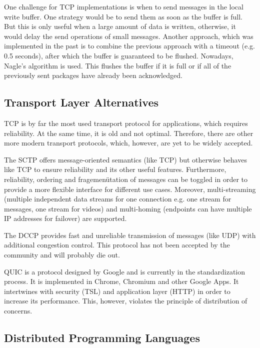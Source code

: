 One challenge for TCP implementations is when to send messages in the local write buffer. One strategy would be to send them as soon as the buffer is full. But this is only useful when a large amount of data is written, otherwise, it would delay the send operations of small messages. Another approach, which was implemented in the past is to combine the previous approach with a timeout (e.g. 0.5 seconds), after which the buffer is guaranteed to be flushed. Nowadays, Nagle's algorithm is used. This flushes the buffer if it is full or if all of the previously sent packages have already been acknowledged.


\subsection{Transport Layer Alternatives}

TCP is by far the most used transport protocol for applications, which requires reliability. At the same time, it is old and not optimal. Therefore, there are other more modern transport protocols, which, however, are yet to be widely accepted.

The \ac{SCTP} offers message-oriented semantics (like TCP) but otherwise behaves like TCP to ensure reliability and its other useful features. Furthermore, reliability, ordering and fragemenütation of messages can be toggled in order to provide a more flexible interface for different use cases. Moreover, multi-streaming (multiple independent data streams for one connection e.g. one stream for messages, one stream for videos) and multi-homing (endpoints can have multiple IP addresses for failover) are supported.

The \ac{DCCP} provides fast and unreliable transmission of messages (like UDP) with additional congestion control. This protocol has not been accepted by the community and will probably die out.

\ac{QUIC} is a protocol designed by Google and is currently in the standardization process. It is implemented in Chrome, Chromium and other Google Apps. It intertwines with security (TSL) and application layer (HTTP) in order to increase its performance. This, however, violates the principle of distribution of concerns.


\subsection{Distributed Programming Languages}

